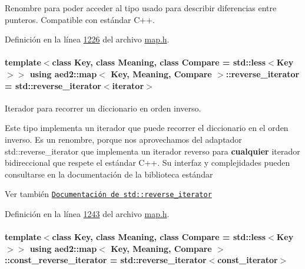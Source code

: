 Renombre para poder acceder al tipo usado para describir diferencias entre punteros. Compatible con estándar C++. 



Definición en la línea \hyperlink{map_8h_source_l01226}{1226} del archivo \hyperlink{map_8h_source}{map.\+h}.

\paragraph[{\texorpdfstring{reverse\+\_\+iterator}{reverse_iterator}}]{\setlength{\rightskip}{0pt plus 5cm}template$<$class Key, class Meaning, class Compare = std\+::less$<$\+Key$>$$>$ using {\bf aed2\+::map}$<$ Key, Meaning, Compare $>$\+::{\bf reverse\+\_\+iterator} =  std\+::reverse\+\_\+iterator$<${\bf iterator}$>$}\hypertarget{classaed2_1_1map_a8e6a592062260177fd73b2f9897b1dd5_a8e6a592062260177fd73b2f9897b1dd5}{}\label{classaed2_1_1map_a8e6a592062260177fd73b2f9897b1dd5_a8e6a592062260177fd73b2f9897b1dd5}


Iterador para recorrer un diccionario en orden inverso. 

Este tipo implementa un iterador que puede recorrer el diccionario en el orden inverso. Es un renombre, porque nos aprovechamos del adaptador {\ttfamily std\+::reverse\+\_\+iterator} que implementa un iterador reverso para {\bfseries cualquier} iterador bidireccional que respete el estándar C++. Su interfaz y complejidades pueden consultarse en la documentación de la biblioteca estándar

\begin{DoxySeeAlso}{Ver también}
\href{http://en.cppreference.com/w/cpp/iterator/reverse_iterator}{\tt Documentación de {\ttfamily std\+::reverse\+\_\+iterator}} 
\end{DoxySeeAlso}


Definición en la línea \hyperlink{map_8h_source_l01243}{1243} del archivo \hyperlink{map_8h_source}{map.\+h}.

\paragraph[{\texorpdfstring{const\+\_\+reverse\+\_\+iterator}{const_reverse_iterator}}]{\setlength{\rightskip}{0pt plus 5cm}template$<$class Key, class Meaning, class Compare = std\+::less$<$\+Key$>$$>$ using {\bf aed2\+::map}$<$ Key, Meaning, Compare $>$\+::{\bf const\+\_\+reverse\+\_\+iterator} =  std\+::reverse\+\_\+iterator$<${\bf const\+\_\+iterator}$>$}\hypertarget{classaed2_1_1map_aed66a216549d13078a3ea6978ea0b768_aed66a216549d13078a3ea6978ea0b768}{}\label{classaed2_1_1map_aed66a216549d13078a3ea6978ea0b768_aed66a216549d13078a3ea6978ea0b768}


